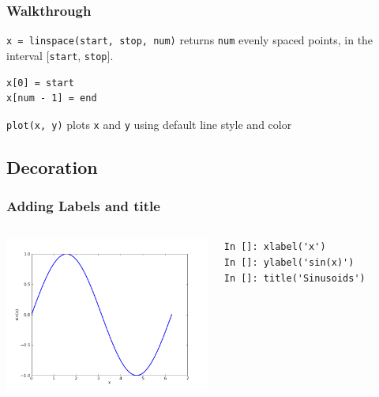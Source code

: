 \documentclass[14pt,compress]{beamer}
\newcounter{time}
\newcommand{\inctime}[1]{\addtocounter{time}{#1}{\tiny \thetime\ m}}
\newcommand{\typ}[1]{\lstinline{#1}}
\begin{document}
\begin{frame}[fragile]
\frametitle{Walkthrough}
\begin{block}{\typ{x = linspace(start, stop, num)} }
returns \typ{num} evenly spaced points, in the interval [\typ{start}, \typ{stop}].
\end{block}
\begin{lstlisting}
x[0] = start
x[num - 1] = end
\end{lstlisting}
\vspace*{.35in}
\begin{block}{\typ{plot(x, y)}}
plots \typ{x} and \typ{y} using default line style and color
\end{block}
\end{frame}

\subsection{Decoration}
\begin{frame}[fragile]
\frametitle{Adding Labels and title}
\begin{columns}
  \hspace*{-0.45in}
  \includegraphics[height=2in, interpolate=true]{data/label}  
  \hspace*{0.5in}
  \begin{block}{}
  \small
  \begin{lstlisting}
In []: xlabel('x')
In []: ylabel('sin(x)')
In []: title('Sinusoids')

  \end{lstlisting}
  \small

  \end{block}
\end{columns}
\end{frame}
\end{document}
